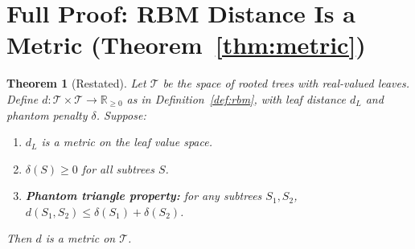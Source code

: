 \documentclass[11pt]{article}
\newtheorem*{theorem*}{Theorem}
\newcommand{\R}{\mathbb{R}}
\newcommand{\calT}{\mathcal{T}}
\begin{document}
\clearpage
\appendix

\section{Full Proof: RBM Distance Is a Metric (Theorem~\ref{thm:metric})}
\label{app:metric}

\begin{theorem*}[Restated]
Let $\calT$ be the space of rooted trees with real-valued leaves. Define
$d : \calT \times \calT \to \R_{\ge 0}$ as in Definition~\ref{def:rbm},
with leaf distance $d_L$ and phantom penalty $\delta$. Suppose:
\begin{enumerate}[nosep]
  \item $d_L$ is a metric on the leaf value space.
  \item $\delta(S) \ge 0$ for all subtrees $S$.
  \item \textbf{Phantom triangle property:} for any subtrees $S_1, S_2$,
    $d(S_1, S_2) \le \delta(S_1) + \delta(S_2)$.
\end{enumerate}
Then $d$ is a metric on $\calT$.
\end{theorem*}
\end{document}
